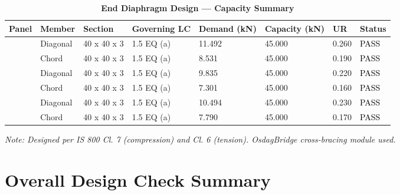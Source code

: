 \documentclass[12pt,a4paper]{report}
\numberwithin{table}{chapter}
\numberwithin{figure}{chapter}
\begin{document}
\vspace{1em}

\begin{longtable}{|C{2.0cm}|L{1.8cm}|C{2.2cm}|C{3.0cm}|C{1.8cm}|C{1.8cm}|C{1.2cm}|C{1.8cm}|}
\caption{\textbf{End Diaphragm Design --- Capacity Summary}}
\hline
\textbf{Panel} & \textbf{Member} & \textbf{Section} & \textbf{Governing LC} & \textbf{Demand (kN)} & \textbf{Capacity (kN)} & \textbf{UR} & \textbf{Status} \\[6pt]
\hline
{} & Diagonal & 40 x 40 x 3 & 1.5 EQ (a) & 11.492 & 45.000 & 0.260 & \textcolor{black}{PASS} \\[6pt]
 & Chord & 40 x 40 x 3 & 1.5 EQ (a) & 8.531 & 45.000 & 0.190 & \textcolor{black}{PASS} \\[6pt]
\hline
{} & Diagonal & 40 x 40 x 3 & 1.5 EQ (a) & 9.835 & 45.000 & 0.220 & \textcolor{black}{PASS} \\[6pt]
 & Chord & 40 x 40 x 3 & 1.5 EQ (a) & 7.301 & 45.000 & 0.160 & \textcolor{black}{PASS} \\[6pt]
\hline
{} & Diagonal & 40 x 40 x 3 & 1.5 EQ (a) & 10.494 & 45.000 & 0.230 & \textcolor{black}{PASS} \\[6pt]
 & Chord & 40 x 40 x 3 & 1.5 EQ (a) & 7.790 & 45.000 & 0.170 & \textcolor{black}{PASS} \\[6pt]
\hline
\end{longtable}
\noindent\textit{Note: Designed per IS 800 Cl. 7 (compression) and Cl. 6 (tension). OsdagBridge cross-bracing module used.}

\section{Overall Design Check Summary}
\label{sec:overall-summary}
\end{document}
